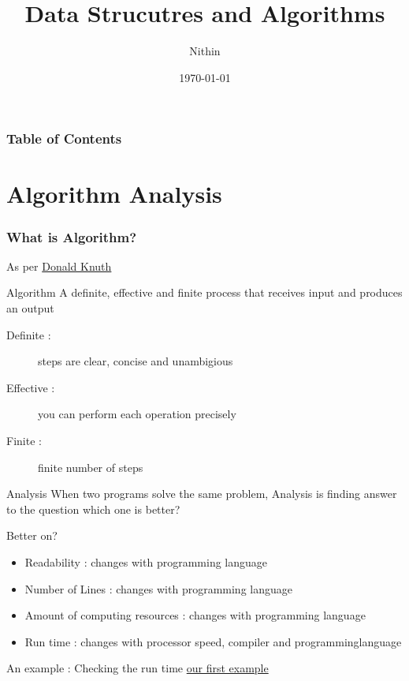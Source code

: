 \documentclass{beamer}
\title{Data Strucutres and Algorithms}
\author{Nithin}
\institute{}
\date{\today}
\begin{document}
\frame{\titlepage}

\begin{frame}
    \frametitle{Table of Contents}
    \tableofcontents
\end{frame}
\section{Algorithm Analysis}
\begin{frame}
\frametitle{What is Algorithm?}
As per \href{https://en.wikipedia.org/wiki/Donald_Knuth}{Donald Knuth}
\begin{alertblock}{Algorithm}
     A definite, effective and finite process that receives input and produces an output
\end{alertblock}
\begin{description}
    \item [Definite :] steps are clear, concise and unambigious
    \item [Effective :] you can perform each operation precisely 
    \item [Finite :] finite number of steps
\end{description}
\begin{alertblock}{Analysis}
    When two programs solve the same problem, Analysis is finding answer to the question which one is \alert{better}?
\end{alertblock}

\end{frame}


\begin{frame}{Better on?}
    \begin{itemize}
        \item <1-> Readability : \pause changes with programming language \pause
        \item <2-> Number of Lines : \pause changes with programming language \pause
        \item <3-> Amount of computing resources : \pause changes with programming language\pause
        \item <4-> Run time : \pause changes with processor speed, compiler and programminglanguage \pause
    \end{itemize}
\end{frame}

\begin{frame}{An example : Checking the run time}
    \href{run://home/nithin/Work/python/dsa/big-o/}{our first example}
\end{frame}
\end{document}
